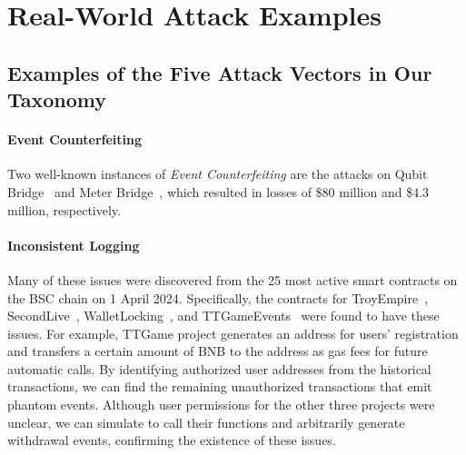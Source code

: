 \appendices


\section{Real-World Attack Examples}

\subsection{Examples of the Five Attack Vectors in Our Taxonomy}
\label{appendix:examples}

\paragraph{Event Counterfeiting}
Two well-known instances of \emph{Event Counterfeiting} are the attacks on Qubit Bridge~\cite{Qubit} and Meter Bridge~\cite{Meter}, which resulted in losses of \$80 million and \$4.3 million, respectively.

\paragraph{Inconsistent Logging}
Many of these issues were discovered from the 25 most active smart contracts on the BSC chain on 1 April 2024. Specifically, the contracts for TroyEmpire~\cite{TroyEmpire}, SecondLive~\cite{SecondLive}, WalletLocking~\cite{WalletLocking}, and TTGameEvents~\cite{TTGame} were found to have these issues. For example, TTGame project generates an address for users' registration and transfers a certain amount of BNB to the address as gas fees for future automatic calls. By identifying authorized user addresses from the historical transactions, we can find the remaining unauthorized transactions that emit phantom events. Although user permissions for the other three projects were unclear, we can simulate to call their functions and arbitrarily generate withdrawal events, confirming the existence of these issues.

